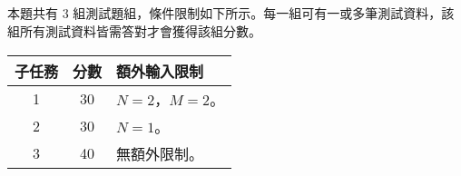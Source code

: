 \subsection*{}
本題共有 $3$ 組測試題組，條件限制如下所示。每一組可有一或多筆測試資料，該組所有測試資料皆需答對才會獲得該組分數。
\begin{center}
    \begin{tabular}[t]{@{}ccl@{}}
    \toprule
    子任務 & 分數 & 額外輸入限制\\
    \midrule
    1 & 30 & $N=2$，$M=2$。\\
    2 & 30 & $N=1$。\\
    3 & 40 & 無額外限制。\\
    \bottomrule
    \end{tabular}
\end{center}


